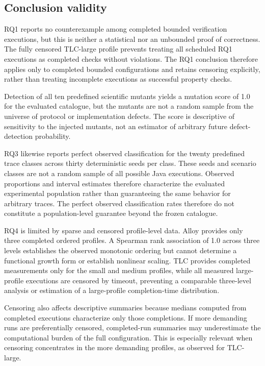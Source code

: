 \subsection{Conclusion validity}
\label{subsec:conclusion-validity}

RQ1 reports no counterexample among completed bounded verification executions,
but this is neither a statistical nor an unbounded proof of correctness. The
fully censored TLC-large profile prevents treating all scheduled RQ1 executions
as completed checks without violations. The RQ1 conclusion therefore applies
only to completed bounded configurations and retains censoring explicitly,
rather than treating incomplete executions as successful property checks.

Detection of all ten predefined scientific mutants yields a mutation score of
1.0 for the evaluated catalogue, but the mutants are not a random sample from
the universe of protocol or implementation defects. The score is descriptive
of sensitivity to the injected mutants, not an estimator of arbitrary future
defect-detection probability.

RQ3 likewise reports perfect observed classification for the twenty predefined
trace classes across thirty deterministic seeds per class. These seeds and
scenario classes are not a random sample of all possible Java executions.
Observed proportions and interval estimates therefore characterize the
evaluated experimental population rather than guaranteeing the same behavior
for arbitrary traces. The perfect observed classification rates therefore do
not constitute a population-level guarantee beyond the frozen catalogue.

RQ4 is limited by sparse and censored profile-level data. Alloy provides only
three completed ordered profiles. A Spearman rank association of 1.0 across
three levels establishes the observed monotonic ordering but cannot determine a
functional growth form or establish nonlinear scaling. TLC provides completed
measurements only for the small and medium profiles, while all measured
large-profile executions are censored by timeout, preventing a comparable
three-level analysis or estimation of a large-profile completion-time
distribution.

Censoring also affects descriptive summaries because medians computed from
completed executions characterize only those completions. If more demanding
runs are preferentially censored, completed-run summaries may underestimate the
computational burden of the full configuration. This is especially relevant
when censoring concentrates in the more demanding profiles, as observed for
TLC-large.

